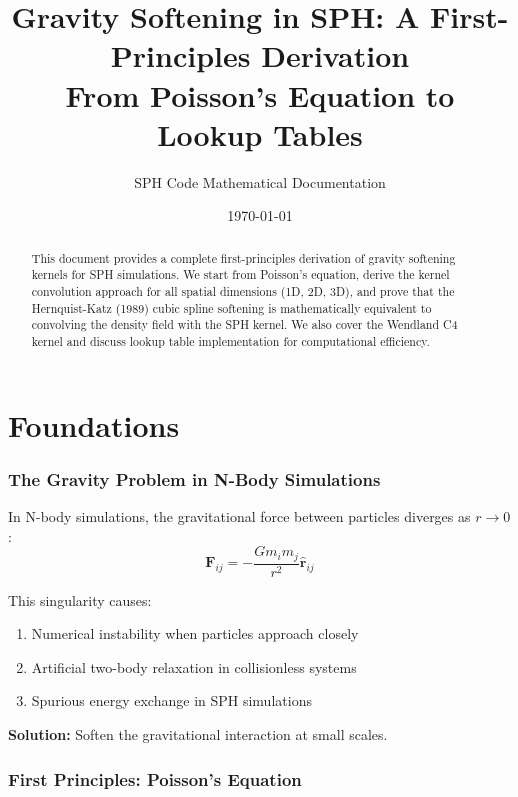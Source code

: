 \documentclass[12pt]{article}
\title{\textbf{Gravity Softening in SPH: A First-Principles Derivation}\\[0.5em]
\large From Poisson's Equation to Lookup Tables}
\author{SPH Code Mathematical Documentation}
\date{\today}
\begin{document}
\maketitle

\begin{abstract}
This document provides a complete first-principles derivation of gravity softening
kernels for SPH simulations. We start from Poisson's equation, derive the kernel
convolution approach for all spatial dimensions (1D, 2D, 3D), and prove that the
Hernquist-Katz (1989) cubic spline softening is mathematically equivalent to
convolving the density field with the SPH kernel. We also cover the Wendland C4
kernel and discuss lookup table implementation for computational efficiency.
\end{abstract}

\tableofcontents
\newpage

\part{Foundations}

\section{The Gravity Problem in N-Body Simulations}

In N-body simulations, the gravitational force between particles diverges as $r \to 0$:
\begin{equation}
\mathbf{F}_{ij} = -\frac{Gm_i m_j}{r^2} \hat{\mathbf{r}}_{ij}
\end{equation}

This singularity causes:
\begin{enumerate}
\item Numerical instability when particles approach closely
\item Artificial two-body relaxation in collisionless systems
\item Spurious energy exchange in SPH simulations
\end{enumerate}

\textbf{Solution:} Soften the gravitational interaction at small scales.

\section{First Principles: Poisson's Equation}
\end{document}
